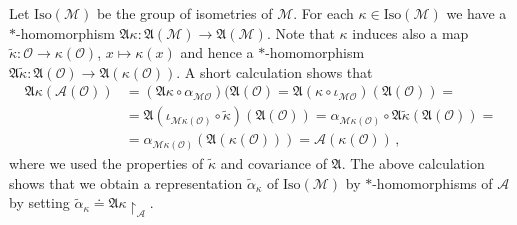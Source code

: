 \documentclass[11pt]{article}
\newcommand{\fA}{\mathfrak{A}}
\newcommand{\Mcal}{\mathcal{M}}
\newcommand{\Ocal}{\mathcal{O}}
\newcommand{\Acal}{\mathcal{A}}
\newcommand{\al}{\alpha}
\newcommand{\1}{\mathds{1}}                         %
\begin{document}
{ Let $\mathrm{Iso}(\Mcal)$ be the group of isometries of $\Mcal$. For each  $\kappa\in\mathrm{Iso}(\Mcal)$ we have a $*$-homomorphism $\fA\kappa:\fA(\Mcal)\rightarrow \fA(\Mcal)$. Note that $\kappa$ induces also a map $\tilde{\kappa}:\Ocal\rightarrow \kappa(\Ocal)$, $x\mapsto \kappa(x)$ and hence a $*$-homomorphism $\fA\tilde{\kappa}:\fA(\Ocal)\rightarrow \fA(\kappa(\Ocal))$. A short calculation shows that
\begin{align*}
\fA\kappa(\Acal(\Ocal))&=(\fA\kappa\circ\al_{\Mcal\Ocal})(\fA(\Ocal)=\fA({\kappa\circ\iota_{\Mcal\Ocal}})(\fA(\Ocal))=\\
&=\fA({\iota_{\Mcal\kappa(\Ocal)}\circ\tilde{\kappa}})(\fA(\Ocal))=\al_{\Mcal\kappa(\Ocal)}\circ\fA{\tilde{\kappa}}(\fA(\Ocal))=\\
&=\al_{\Mcal\kappa(\Ocal)}(\fA(\kappa(\Ocal)))=\Acal(\kappa(\Ocal))\,,
\end{align*}
where we used the properties of $\tilde{\kappa}$ and covariance of $\fA$. The above calculation shows that we obtain a representation $\tilde{\al}_\kappa$ of $\mathrm{Iso}(\Mcal)$ by  $*$-homomorphisms of $\Acal$ by setting $\tilde{\al}_\kappa\doteq\fA\kappa\upharpoonright_{\Acal}$.

}
\end{document}
